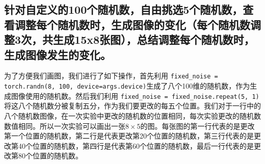 \documentclass{article}
\begin{document}
\subsection{针对自定义的100个随机数，自由挑选5个随机数，查看调整每个随机数时，生成图像的变化（每个随机数调整3次，共生成15x8张图），总结调整每个随机数时，生成图像发生的变化。}
为了方便我们画图，我们进行了如下操作，首先利用 \lstinline{fixed_noise = torch.randn(8, 100, device=args.device)}生成了八个100维的随机数，作为生成图像使用的随机数。然后我们利用 \lstinline[]{fixed_noise = fixed_noise.repeat(5, 1)}将这八个随机数分被复制五分，作为我们要更改的每五个位置。我们对于一行中的八个随机数图像，在一次实验中更改的随机数的位置相同，每次实验更改的随机数数值相同。所以一次实验可以画出一张$8\times 5$的图。每张图的第一行代表的是更改第一个位置的随机数，第二行是代表更改第20个位置的随机数，第三行代表的是更改第40个位置的随机数，第四行是代表第60个位置的随机数，最后一行代表的是更改第80个位置的随机数。
\end{document}
